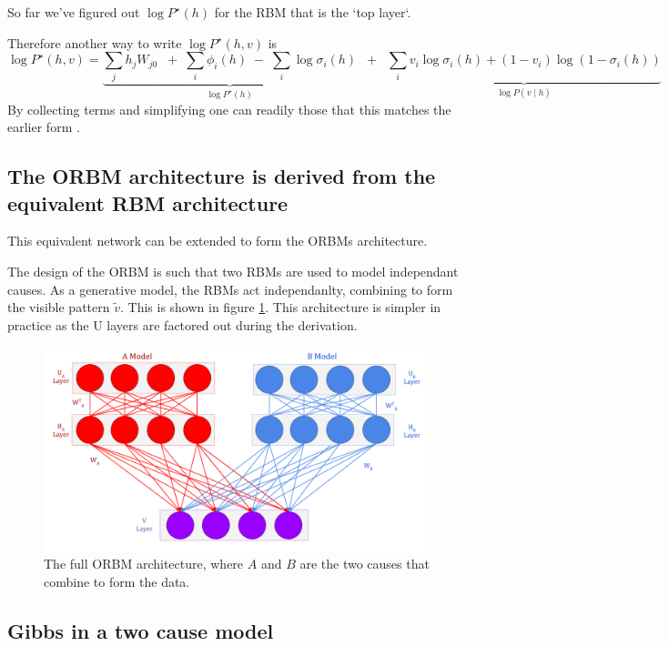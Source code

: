 So far we've figured out $\log P^\star(h)$ for the RBM that is the `top layer`.

Therefore another way to write $\log P^\star(h,v)$ is
$$
\log P^\star(h,v) = \underbrace{\sum_j h_j  W_{j0} \;\; + \; \sum_i \phi_i(h) \;  - \; \sum_i \log \sigma_i(h)}_{\log P^\star(h)} \;\;+\;\; \underbrace{\sum_i v_i \log \sigma_i(h) + (1-v_i) \log (1 - \sigma_i(h))}_{\log P(v \mid h)}
$$
By collecting terms and simplifying one can readily those that this matches the earlier form .


\subsection{The ORBM architecture is derived from the equivalent RBM architecture}
This equivalent network can be extended to form the ORBMs architecture.

The design of the ORBM is such that two RBMs are used to model independant causes. As a generative model, the RBMs act independanlty, combining to form the visible pattern $\tilde{v}$. This is shown in figure \ref{F:ORBM-Architecture}. This architecture is simpler in practice as the U layers are factored out during the derivation.

\begin{figure}[h]
\begin{center}
  \includegraphics[width = 7in]{Assets/ORBM-Full-Architecture.png}
\caption{The full ORBM architecture, where $A$ and $B$ are the two causes that combine to form the data.}
\label{F:ORBM-Architecture}
\end{center}
\end{figure}

\subsection{Gibbs in a two cause model}

